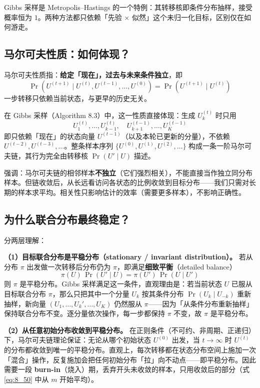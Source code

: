 \begin{remark}
    Gibbs 采样是 Metropolis--Hastings 的一个特例：其转移核即条件分布抽样，接受概率恒为 $1$。两种方法都只依赖「先验 $\times$ 似然」这个未归一化目标，区别仅在如何游走。
\end{remark}

\subsection{马尔可夫性质：如何体现？}

马尔可夫性质指：\textbf{给定「现在」，过去与未来条件独立}，即
\[
    \Pr(U^{(t+1)} \mid U^{(t)}, U^{(t-1)}, \ldots, U^{(0)}) = \Pr(U^{(t+1)} \mid U^{(t)})
\]
一步转移只依赖当前状态，与更早的历史无关。

在 Gibbs 采样（Algorithm 8.3）中，这一性质直接体现：生成 $U_k^{(t)}$ 时只用
\[
    U_1^{(t)}, \ldots, U_{k-1}^{(t)},\quad U_{k+1}^{(t-1)}, \ldots, U_K^{(t-1)}
\]
即只依赖「现在」的状态向量 $U^{(t-1)}$（以及本轮已更新的分量），不依赖 $U^{(t-2)}, U^{(t-3)}, \ldots$。整条样本序列 $\{U^{(0)}, U^{(1)}, U^{(2)}, \ldots\}$ 构成一条一阶马尔可夫链，其行为完全由转移核 $\Pr(U' \mid U)$ 描述。

\begin{remark}
    强调：马尔可夫链的相邻样本\textbf{不独立}（它们强烈相关），不能直接当作独立同分布样本。但链收敛后，从长远看访问各状态的比例收敛到目标分布——我们只需对长期的样本求平均。相关性只影响估计的效率（需要更多样本），不影响正确性。
\end{remark}

\subsection{为什么联合分布最终稳定？}

分两层理解：

\textbf{（1）目标联合分布是平稳分布（stationary / invariant distribution）。} 若从分布 $\pi$ 出发做一次转移后分布仍为 $\pi$，即满足\textbf{细致平衡}（detailed balance）
\[
    \pi(U)\,\Pr(U' \mid U) = \pi(U')\,\Pr(U \mid U')
\]
则 $\pi$ 是平稳分布。Gibbs 采样满足这一条件，直观理由是：若当前状态 $U$ 已服从目标联合分布 $\pi$，那么只把其中一个分量 $U_k$ 按其条件分布 $\Pr(U_k \mid U_{-k})$ 重新抽样，新向量 $(U_1, \ldots, U_k', \ldots, U_K)$ 仍然服从 $\pi$——因为「从条件分布重新抽样」保持联合分布不变。逐分量依次操作，每一步都保持 $\pi$ 不变，故 $\pi$ 是平稳分布。

\textbf{（2）从任意初始分布收敛到平稳分布。} 在正则条件（不可约、非周期、正递归）下，马尔可夫链理论保证：无论从哪个初始状态 $U^{(0)}$ 出发，当 $t \to \infty$ 时 $U^{(t)}$ 的分布都收敛到唯一的平稳分布。直观上，每次转移都在状态分布空间上施加一次「混合」操作，反复施加会把任何初始分布「拉」向不动点——即平稳分布。因此需要一段 \textbf{burn-in}（烧入）期，丢弃开头未收敛的样本，只用收敛后的部分（式 \eqref{eq:8_50} 中从 $m$ 开始平均）。

